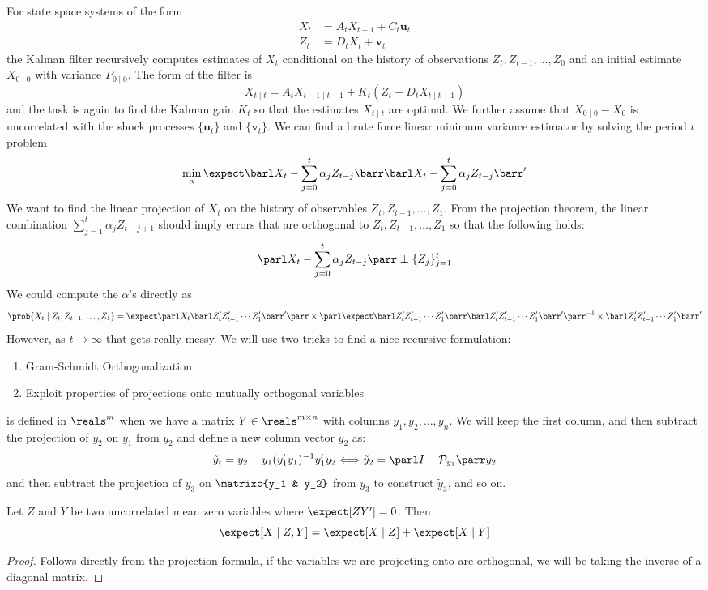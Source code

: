 \documentclass[10pt]{article}
\begin{document}
\begin{example}
	 For state space systems of the form \begin{align*}X_t &= A_tX_{t-1} + C_t \bm{u}_t \\ Z_t &= D_tX_t + \bm{v}_t\end{align*} the Kalman filter recursively computes estimates of $X_t$ conditional on the history of observations $Z_t,Z_{t-1},\dots,Z_0$ and an initial estimate $X_{0\mid0}$ with variance $P_{0\mid0}$. The form of the filter is \[X_{t\mid t} = A_t X_{t-1\mid t-1} + K_t(Z_t - D_tX_{t\mid t-1})\]and the task is again to find the Kalman gain $K_t$ so that the estimates $X_{t\mid t}$ are optimal. We further assume that $X_{0\mid0}-X_0$ is uncorrelated with the shock processes $\{\bm{u}_t\}$ and $\{\bm{v}_t\}$. We can find a brute force linear minimum variance estimator by solving the period $t$ problem\[\min_\alpha \expect \barl X_t - \sum_{j=0}^t \alpha_j Z_{t-j}\barr \barl X_t - \sum_{j=0}^t \alpha_j Z_{t-j}\barr'\]We want to find the linear projection of $X_t$ on the history of observables $Z_t,Z_{t-1},\dots,Z_1$. From the projection theorem, the linear combination $\sum_{j=1}^t \alpha_j Z_{t-j+1}$ should imply errors that are orthogonal to $Z_t,Z_{t-1},\dots,Z_1$ so that the following holds:\[\parl X_t - \sum_{j=0}^t \alpha_j Z_{t-j}\parr \perp \{Z_j\}_{j=1}^t\]We could compute the $\alpha$'s directly as\[\prob\{X_t \mid Z_t,Z_{t-1},\dots,Z_1\} = \expect \parl X_t\barl Z_t'Z_{t-1}'\cdots Z_1'\barr'\parr \times \parl \expect \barl Z_t'Z_{t-1}'\cdots Z_1'\barr\barl Z_t'Z_{t-1}'\cdots Z_1'\barr'\parr^{-1} \times \barl Z_t'Z_{t-1}'\cdots Z_1'\barr'\]However, as $t\to\infty$ that gets really messy. We will use two tricks to find a nice recursive formulation:
	\begin{enumerate}
		\item Gram-Schmidt Orthogonalization
		\item Exploit properties of projections onto mutually orthogonal variables
	\end{enumerate}
	\begin{definition}
		 is defined in $\reals^m$ when we have a matrix $Y \in \reals^{m \times n}$ with columns $y_1,y_2,\dots,y_n$. We will keep the first column, and then subtract the projection of $y_2$ on $y_1$ from $y_2$ and define a new column vector $\tilde{y}_2$ as:\[\tilde{y}_t = y_2 - y_1(y_1'y_1)^{-1}y_1'y_2 \Longleftrightarrow \tilde{y}_2 = \parl I - \mathcal{P}_{y_1}\parr y_2\]and then subtract the projection of $y_3$ on $\matrixc{y_1 & y_2}$ from $y_3$ to construct $\tilde{y}_3$, and so on.
	\end{definition}
	\begin{lemma}
		Let $Z$ and $Y$ be two uncorrelated mean zero variables where $\expect[ZY'] = 0$. Then\[\expect[ X \mid Z,Y] = \expect [X \mid Z] + \expect[ X \mid Y]\]
	\end{lemma}
	\begin{proof}
		Follows directly from the projection formula, if the variables we are projecting onto are orthogonal, we will be taking the inverse of a diagonal matrix.
	\end{proof}
	

\end{example}
\end{document}
